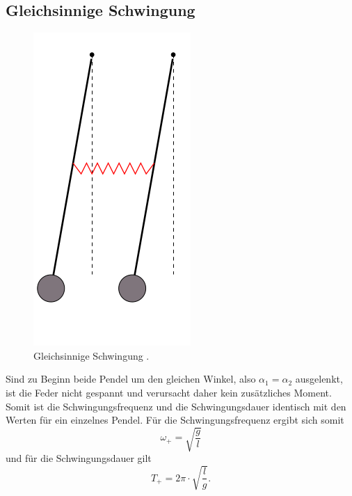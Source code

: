 \subsection{Gleichsinnige Schwingung}
\FloatBarrier
\begin{figure}
	\centering
	\includegraphics[width=0.4\linewidth]{Bilder/gleichphasig.png}
	\caption{Gleichsinnige Schwingung \cite{Anleitung}.}
	\label{fig:gleich}
\end{figure}
\FloatBarrier
Sind zu Beginn beide Pendel um den gleichen Winkel, also $\alpha_1=\alpha_2$ ausgelenkt, ist die Feder nicht gespannt und verursacht daher kein zusätzliches Moment.
Somit ist die Schwingungsfrequenz und die Schwingungsdauer identisch mit den Werten für ein einzelnes Pendel.
Für die Schwingungsfrequenz ergibt sich somit
\begin{equation}
	\label{eqn:wgleich}
	\omega_{\mathrm{+}}=\sqrt{\frac{g}{l}}
\end{equation}
und für die Schwingungsdauer gilt
\begin{equation}
	\label{eqn:tgleich}
	T_{\mathrm{+}}=2\pi\cdot\sqrt{\frac{l}{g}} \text{.}
\end{equation}

